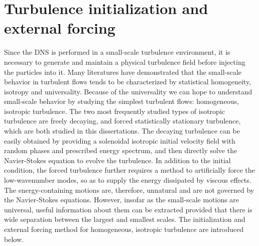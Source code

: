 \section{Turbulence initialization and external forcing}
Since the DNS is performed in a small-scale turbulence environment, it is necessary to generate and maintain a physical turbulence field before injecting the particles into it. Many literatures \cite{Eswaran1988} have demonstrated that the small-scale behavior in turbulent flows tends to be characterized by statistical homogeneity, isotropy and universality. Because of the universality we can hope to understand small-scale behavior by studying the simplest turbulent flows: homogeneous, isotropic turbulence. The two most frequently studied types of isotropic turbulence are freely decaying, and forced statistically stationary turbulence, which are both studied in this dissertations. The decaying turbulence can be easily obtained by providing a solenoidal isotropic initial velocity field with random phases and prescribed energy spectrum, and then directly solve the Navier-Stokes equation to evolve the turbulence. In addition to the initial condition, the forced turbulence further requires a method to artificially force the low-wavenumber modes, so as to supply the energy dissipated by viscous effects. The energy-containing motions are, therefore, unnatural and are not governed by the Navier-Stokes equations. However, insofar as the small-scale motions are universal, useful information about them can be extracted provided that there is wide separation between the largest and smallest scales. The initialization and external forcing method for homogeneous, isotropic turbulence are introduced below. 

